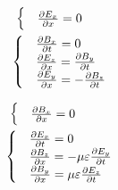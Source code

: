 \begin{minipage}[t]{0.5\textwidth}
    \[
        \begin{split}
            &\,\,\begin{cases}
                &\pdv{E_x}{x}=0 \\
            \end{cases} \\
            & \begin{cases}
                & \pdv{B_x}{t}=0 \\
                & \pdv{E_z}{x}=\pdv{B_y}{t} \\
                & \pdv{E_y}{x}=-\pdv{B_z}{t} \\
            \end{cases} \\
        \end{split}
    \]
\end{minipage}
\begin{minipage}[t]{0.5\textwidth}
    \[
        \begin{split}
            &\,\,\begin{cases}
                &\pdv{B_x}{x}=0 \\
            \end{cases} \\
            & \begin{cases}
                & \pdv{E_x}{t}=0 \\
                & \pdv{B_z}{x}=- \mu\varepsilon \pdv{E_y}{t} \\
                & \pdv{B_y}{x}=\mu\varepsilon \pdv{E_z}{t} \\
            \end{cases} \\
        \end{split}
    \]
\end{minipage}


